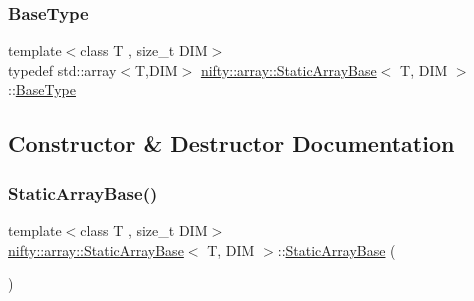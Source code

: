\subsubsection{\texorpdfstring{Base\+Type}{BaseType}}
{\footnotesize\ttfamily template$<$class T , size\+\_\+t D\+IM$>$ \\
typedef std\+::array$<$T,D\+IM$>$ \hyperlink{classnifty_1_1array_1_1StaticArrayBase}{nifty\+::array\+::\+Static\+Array\+Base}$<$ T, D\+IM $>$\+::\hyperlink{classnifty_1_1array_1_1StaticArrayBase_a3f376d2a24fad3a47021c36657494759}{Base\+Type}}



\subsection{Constructor \& Destructor Documentation}
\mbox{\label{classnifty_1_1array_1_1StaticArrayBase_ab15a9b2d0259a54795ffc5aac8d62e50}} 
\subsubsection{\texorpdfstring{Static\+Array\+Base()}{StaticArrayBase()}\hspace{0.1cm}{\footnotesize\ttfamily [1/3]}}
{\footnotesize\ttfamily template$<$class T , size\+\_\+t D\+IM$>$ \\
\hyperlink{classnifty_1_1array_1_1StaticArrayBase}{nifty\+::array\+::\+Static\+Array\+Base}$<$ T, D\+IM $>$\+::\hyperlink{classnifty_1_1array_1_1StaticArrayBase}{Static\+Array\+Base} (\begin{DoxyParamCaption}{ }\end{DoxyParamCaption})\hspace{0.3cm}{\ttfamily [inline]}}

\mbox{\label{classnifty_1_1array_1_1StaticArrayBase_aa798253fef388d6c0d0fd3d436784e79}} 

